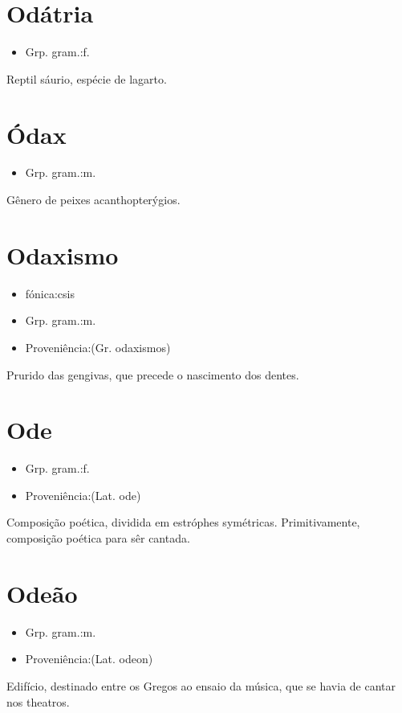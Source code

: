 \section{Odátria}
\begin{itemize}
\item {Grp. gram.:f.}
\end{itemize}
Reptil sáurio, espécie de lagarto.
\section{Ódax}
\begin{itemize}
\item {Grp. gram.:m.}
\end{itemize}
Gênero de peixes acanthopterýgios.
\section{Odaxismo}
\begin{itemize}
\item {fónica:csis}
\end{itemize}
\begin{itemize}
\item {Grp. gram.:m.}
\end{itemize}
\begin{itemize}
\item {Proveniência:(Gr. \textunderscore odaxismos\textunderscore )}
\end{itemize}
Prurido das gengivas, que precede o nascimento dos dentes.
\section{Ode}
\begin{itemize}
\item {Grp. gram.:f.}
\end{itemize}
\begin{itemize}
\item {Proveniência:(Lat. \textunderscore ode\textunderscore )}
\end{itemize}
Composição poética, dividida em estróphes symétricas.
Primitivamente, composição poética para sêr cantada.
\section{Odeão}
\begin{itemize}
\item {Grp. gram.:m.}
\end{itemize}
\begin{itemize}
\item {Proveniência:(Lat. \textunderscore odeon\textunderscore )}
\end{itemize}
Edifício, destinado entre os Gregos ao ensaio da música, que se havia de cantar nos theatros.
